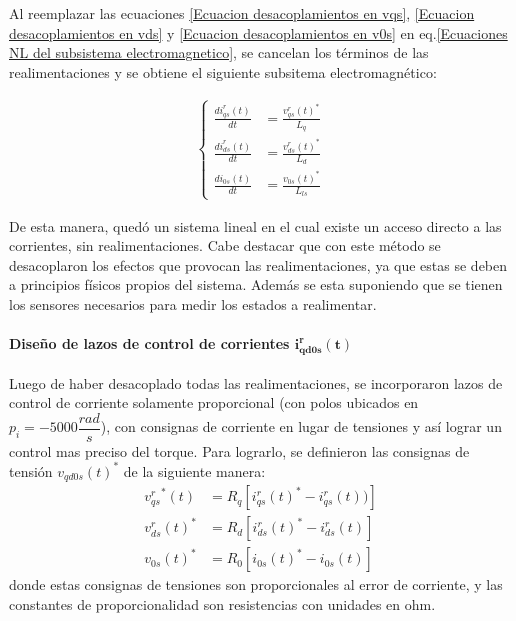 \documentclass[a4paper, 10pt, onecolumn,journal]{ieeeconf}
\begin{document}
Al reemplazar las ecuaciones \eqref{Ecuacion desacoplamientos en vqs}, \eqref{Ecuacion desacoplamientos en vds} y \eqref{Ecuacion desacoplamientos en v0s} en eq.\eqref{Ecuaciones NL del subsistema electromagnetico}, se cancelan los términos de las realimentaciones y se obtiene el siguiente subsitema electromagnético:

\begin{align}
	\begin{cases}
		\frac{d i^r_{qs}(t)}{dt} &= \frac{{v^r_{qs}(t)}^*}{L_q}\\
		\frac{d i^r_{ds}(t)}{dt} &= \frac{{v^r_{ds}(t)}^*}{L_d} \\ 
		\frac{d i_{0s}(t)}{dt}   &= \frac{{v_{0s}(t)}^*}{L_{ls}}
	\end{cases}	\label{Ecuaciones del subsistema electromagnetico sin realimentaciones fisicas}
\end{align}

De esta manera, quedó un sistema lineal en el cual existe un acceso directo a las corrientes, sin realimentaciones. Cabe destacar que con este método se desacoplaron los efectos que provocan las realimentaciones, ya que  estas se deben a principios físicos propios del sistema. Además se esta suponiendo que se tienen los sensores necesarios para medir los estados a realimentar.

\paragraph{\textbf{Diseño de lazos de control de corrientes $\mathbf{{i}^r_{qd0s}(t)}$}}
Luego de haber desacoplado todas las realimentaciones, se incorporaron lazos de control de corriente solamente proporcional (con polos ubicados en $p_{i}=-5000\dfrac{rad}{s}$), con consignas de corriente en lugar de tensiones y así lograr un control mas preciso del torque.
Para lograrlo, se definieron las consignas de tensión  ${v_{qd0s}(t)}^*$ de la siguiente manera:
 \begin{align}
	{v^r_{qs}}^*(t) &= R_q \left[ {i^r_{qs}(t)}^* - i^r_{qs}(t))\right] \label{Ecuacion control corrinte iq}\\
	{v^r_{ds}(t)}^* &= R_d \left[ {i^r_{ds}(t)}^* - i^r_{ds}(t) \right] \label{Ecuacion control corrinte id}\\ 
	{v_{0s}(t)}^*   &= R_0 \left[ {i_{0s}(t)}^* - i_{0s}(t) \right] \label{Ecuacion control corrinte i0}
\end{align}
donde estas consignas de tensiones son proporcionales al error de corriente, y las constantes de proporcionalidad son resistencias con unidades en ohm.
\end{document}
